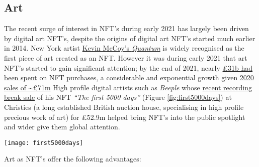 
\subsection{Art}
The recent surge of interest in NFT's during early 2021 has largely been
driven by digital art NFT's, despite the origins of digital art NFT's
started much earlier in 2014. New York artist \href{https://www.mccoyspace.com/project/125/}{Kevin McCoy's
\emph{Quantum}} is widely recognised as the first piece of art created
as an NFT. However it was during early 2021 that art NFT's started to
gain significant attention; by the end of 2021, nearly \href{https://www.paymentscardsandmobile.com/state-of-the-blockchain-nfts-explode-onto-scene-in-2021/}{£31b
had been spent} on NFT purchases, a considerable and exponential growth
given \href{https://raritysniper.com/news/nfts-exploded-in-2021-with-25-billion-in-sales/}{2020
sales of \textasciitilde£71m}
High profile digital artists such as \emph{Beeple} whose
\href{https://www.forbes.com/sites/abrambrown/2021/03/11/beeple-art-sells-for-693-million-becoming-most-expensive-nft-ever/?sh=3f237d1c2448}{recent
recording break sale} of his NFT \emph{``The first 5000 days''} (Figure \ref{fig:first5000days}) at Christies (a long established British auction house,
specialising in high profile precious work of art) for £52.9m helped
bring NFT's into the public spotlight and wider give them global
attention.

\begin{figure*}[ht]\centering %
	\texttt{[image: first5000days]}
	\caption{Beeple: First 5000 days, \href{https://onlineonly.christies.com/s/beeple-first-5000-days/lots/2020}{taken from the Christies website, assumed fair use}.}
	\label{fig:first5000days}
\end{figure*}

Art as NFT's offer the following advantages:

